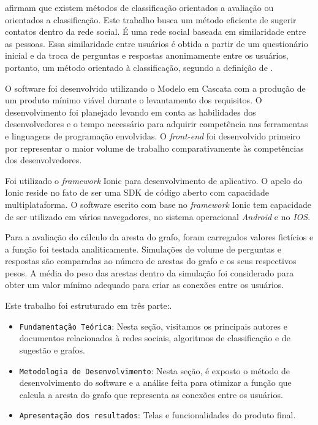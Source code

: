 \cite{Bita2016} afirmam que existem métodos de classificação orientados a avaliação ou orientados a classificação.
Este trabalho busca um método eficiente de sugerir contatos dentro da rede social. É uma rede social baseada em similaridade entre as pessoas. Essa similaridade entre usuários é obtida a partir de um questionário inicial e da troca de perguntas e respostas anonimamente entre os usuários, portanto, um método orientado à classificação, segundo a definição de \cite{Bita2016}.

O software foi desenvolvido utilizando o Modelo em Cascata com a produção de um produto mínimo viável durante o levantamento dos requisitos. O desenvolvimento foi planejado levando em conta as habilidades dos desenvolvedores e o tempo necessário para adquirir competência nas ferramentas e linguagens de programação envolvidas. O \emph{front-end} foi desenvolvido primeiro por representar o maior volume de trabalho comparativamente às competências dos desenvolvedores.

Foi utilizado o \emph{framework} Ionic para desenvolvimento de aplicativo. O apelo do Ionic reside no fato de ser uma SDK de código aberto com capacidade multiplataforma. O software escrito com base no \emph{framework} Ionic tem capacidade de ser utilizado em vários navegadores, no sistema operacional \emph{Android} e no \emph{IOS}.

Para a avaliação do cálculo da aresta do grafo, foram carregados valores fictícios e a função foi testada analiticamente. Simulações de volume de perguntas e respostas são comparadas ao número de arestas do grafo e os seus respectivos pesos. A média do peso das arestas dentro da simulação foi considerado para obter um valor mínimo adequado para criar as conexões entre os usuários.

Este trabalho foi estruturado em três parte:.
\begin{itemize}

\item \verb#Fundamentação Teórica#: Nesta seção, visitamos os principais autores e documentos relacionados à redes sociais, algoritmos de classificação e de sugestão e grafos.

\item \verb#Metodologia de Desenvolvimento#: Nesta seção, é exposto o método de desenvolvimento do software e a análise feita para otimizar a função que calcula a aresta do grafo que representa as conexões entre os usuários.

\item \verb#Apresentação dos resultados#: Telas e funcionalidades do produto final.
\end{itemize}


